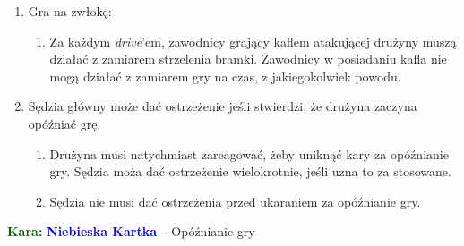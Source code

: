 \documentclass[11pt,a4paper]{article}
\newcommand\bluecard[1]{\bgroup\textcolor{darkgreen}{\textbf{Kara: }}\bgroup\textcolor{blue}{\textbf{Niebieska Kartka}} -- #1}
\begin{document}
\begin{enumerate}
  \item Gra na zwłokę:
  \begin{enumerate}
    \item Za każdym \emph{drive}'em, zawodnicy grający kaflem atakującej drużyny muszą działać z zamiarem strzelenia bramki. Zawodnicy w posiadaniu kafla nie mogą działać z zamiarem gry na czas, z jakiegokolwiek powodu.
  \end{enumerate}
  \item Sędzia główny może dać ostrzeżenie jeśli stwierdzi, że drużyna zaczyna opóźniać grę.
  \begin{enumerate}
    \item Drużyna musi natychmiast zareagować, żeby uniknąć kary za opóźnianie gry. Sędzia moża dać ostrzeżenie wielokrotnie, jeśli uzna to za stosowane.
    \item Sędzia nie musi dać ostrzeżenia przed ukaraniem za opóźnianie gry.
  \end{enumerate}
\end{enumerate}

\bluecard{Opóźnianie gry} %
\end{document}
